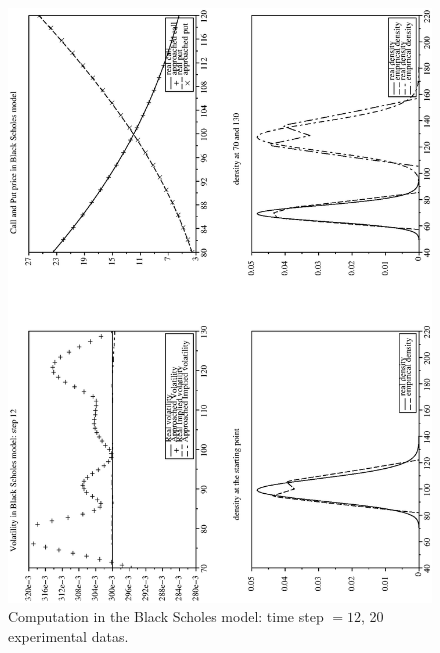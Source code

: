 \documentclass[a4paper]{article}
\begin{document}
\begin{figure}[tbp]
\begin{center}
\includegraphics[width=12.5cm]{ArticlePS/20BS12.eps}
\caption{Computation in the Black Scholes model: time step $=12$,
20 experimental datas.\label{BS12}}
\end{center}
\end{figure}
\end{document}
